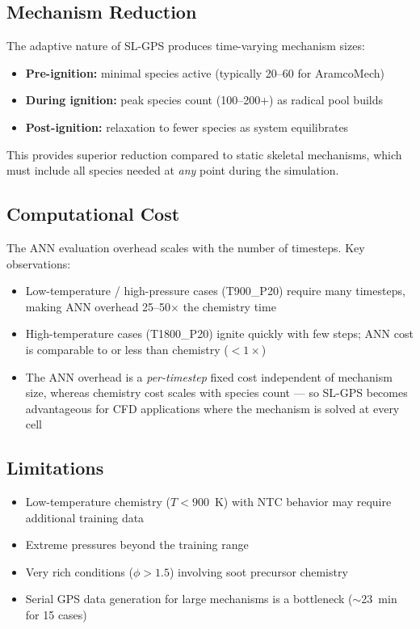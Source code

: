 \documentclass[11pt,a4paper]{article}
\begin{document}
\subsection{Mechanism Reduction}

The adaptive nature of SL-GPS produces time-varying mechanism sizes:
\begin{itemize}
    \item \textbf{Pre-ignition:} minimal species active (typically 20--60 for AramcoMech)
    \item \textbf{During ignition:} peak species count (100--200+) as radical pool builds
    \item \textbf{Post-ignition:} relaxation to fewer species as system equilibrates
\end{itemize}
This provides superior reduction compared to static skeletal mechanisms, which must include all species needed at \emph{any} point during the simulation.

\subsection{Computational Cost}

The ANN evaluation overhead scales with the number of timesteps. Key observations:
\begin{itemize}
    \item Low-temperature / high-pressure cases (T900\_P20) require many timesteps, making ANN overhead 25--50$\times$ the chemistry time
    \item High-temperature cases (T1800\_P20) ignite quickly with few steps; ANN cost is comparable to or less than chemistry ($<1\times$)
    \item The ANN overhead is a \emph{per-timestep} fixed cost independent of mechanism size, whereas chemistry cost scales with species count --- so SL-GPS becomes advantageous for CFD applications where the mechanism is solved at every cell
\end{itemize}

\subsection{Limitations}

\begin{itemize}
    \item Low-temperature chemistry ($T < 900$~K) with NTC behavior may require additional training data
    \item Extreme pressures beyond the training range
    \item Very rich conditions ($\phi > 1.5$) involving soot precursor chemistry
    \item Serial GPS data generation for large mechanisms is a bottleneck ($\sim$23~min for 15 cases)
\end{itemize}
\end{document}
